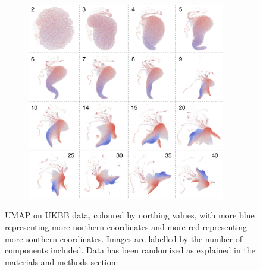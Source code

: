 \documentclass[12pt]{pnas-new}
\begin{document}
\begin{figure}
    \centering
    \begin{subfigure}{0.95\textwidth}
    \includegraphics[width=0.95\textwidth]{images/default_clean_size10_alpha60_ns.jpeg}
    \end{subfigure}
    \caption{UMAP on UKBB data, coloured by northing values, with more blue representing more northern coordinates and more red representing more southern coordinates. Images are labelled by the number of components included. Data has been randomized as explained in the materials and methods section.}
    \label{fig:supp_montage_ukbb_ns}
\end{figure}
\end{document}

